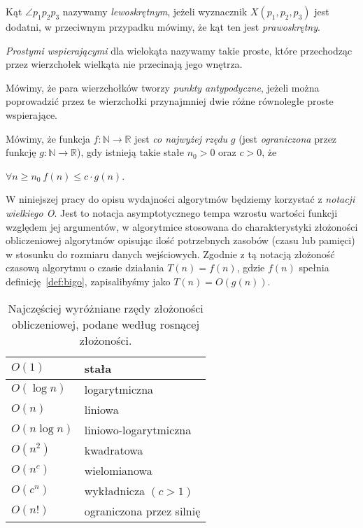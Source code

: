 \begin{definicja}
  Kąt $\angle p_{1}p_{2}p_{3}$ nazywamy \emph{lewoskrętnym}, jeżeli
  wyznacznik $X(p_1, p_2, p_3)$ jest dodatni, w przeciwnym przypadku
  mówimy, że kąt ten jest \emph{prawoskrętny}.
\end{definicja}

\begin{definicja}
  \emph{Prostymi wspierającymi} dla wielokąta nazywamy takie proste,
  które przechodząc przez wierzchołek wielkąta nie przecinają jego
  wnętrza.
\end{definicja}

\begin{definicja}
  Mówimy, że para wierzchołków tworzy \emph{punkty antypodyczne},
  jeżeli można poprowadzić przez te wierzchołki przynajmniej dwie
  różne równoległe proste wspierające.
\end{definicja}

\begin{definicja}\label{def:bigo}
  Mówimy, że funkcja $f\colon \mathbb{N} \to \mathbb{R}$ jest \emph{co
    najwyżej rzędu} $g$ (jest \emph{ograniczona} przez funkcję
  $g\colon \mathbb{N} \to \mathbb{R}$), gdy istnieją takie stałe $n_0
  > 0$ oraz $c > 0$, że

  \begin{center}
    $\forall n \geq n_0\ f(n) \leq c \cdot g(n)$.
  \end{center}
\end{definicja}

W niniejszej pracy do opisu wydajności algorytmów będziemy korzystać z
\emph{notacji wielkiego O}. Jest to notacja asymptotycznego tempa
wzrostu wartości funkcji względem jej argumentów, w algorytmice
stosowana do charakterystyki złożoności obliczeniowej algorytmów
opisując ilość potrzebnych zasobów (czasu lub pamięci) w stosunku do
rozmiaru danych wejściowych. Zgodnie z tą notacją złożoność czasową
algorytmu o czasie działania $T(n) = f(n)$, gdzie $f(n)$ spełnia
definicję~\ref{def:bigo}, zapisalibyśmy jako $T(n) = O(g(n))$.

\begin{table}[htb]
  \centering

  \begin{tabular}{ll}
    \toprule
    $O(1)$ & stała \\
    \midrule
    $O(\log n)$ & logarytmiczna \\
    \midrule
    $O(n)$ & liniowa \\
    \midrule
    $O(n \log n)$ & liniowo-logarytmiczna \\
    \midrule
    $O(n^2)$ & kwadratowa \\
    \midrule
    $O(n^c)$ & wielomianowa \\
    \midrule
    $O(c^n)$ & wykładnicza $(c > 1)$ \\
    \midrule
    $O(n!)$ & ograniczona przez silnię \\
    \bottomrule
  \end{tabular}

  \caption{Najczęściej wyróżniane rzędy złożoności obliczeniowej,
    podane według rosnącej złożoności.}
\end{table}

